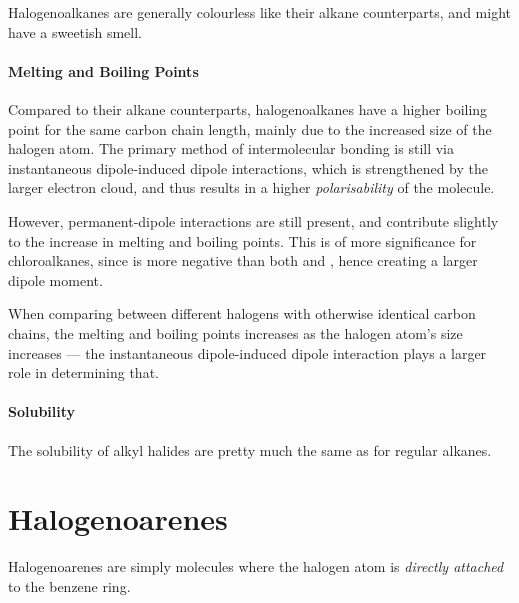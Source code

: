 			Halogenoalkanes are generally colourless like their alkane counterparts, and might have a sweetish smell.

			\paragraph{Melting and Boiling Points}

			Compared to their alkane counterparts, halogenoalkanes have a higher boiling point for the same carbon chain length,
			mainly due to the increased size of the halogen atom. The primary method of intermolecular bonding is still via
			instantaneous dipole-induced dipole interactions, which is strengthened by the larger electron cloud, and thus results in
			a higher \textit{polarisability} of the molecule.

			However, permanent-dipole interactions are still present, and contribute slightly to the increase in melting and boiling points.
			This is of more significance for chloroalkanes, since \ch{\chlorine} is more negative than both  and , hence creating
			a larger dipole moment.

			When comparing between different halogens with otherwise identical carbon chains, the melting and boiling points increases as
			the halogen atom's size increases --- the instantaneous dipole-induced dipole interaction plays a larger role in determining
			that.

			\paragraph{Solubility}

			The solubility of alkyl halides are pretty much the same as for regular alkanes.



	\pagebreak
	\section{Halogenoarenes}

		Halogenoarenes are simply molecules where the halogen atom is \textit{directly attached} to the benzene ring.





